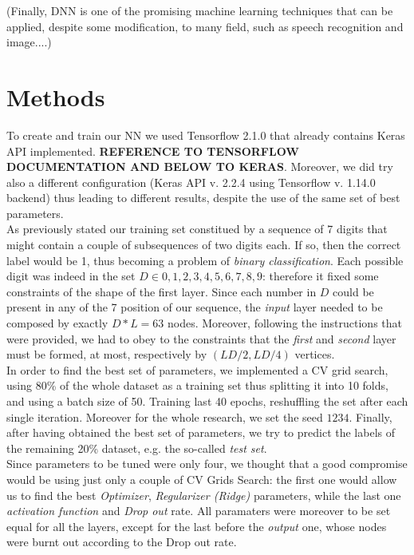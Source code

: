 \documentclass[prl,twocolumn]{revtex4-1}
\begin{document}
(Finally, DNN is one of the promising machine learning techniques that can be applied, despite some modification, to many field, such as speech recognition and image....)





\section{Methods}
To create and train our NN we used Tensorflow 2.1.0 that already contains Keras API implemented. \textbf{REFERENCE TO TENSORFLOW DOCUMENTATION AND BELOW TO KERAS}. Moreover, we did try also a different configuration (Keras API v. 2.2.4 using Tensorflow v. 1.14.0 backend) thus leading to different results, despite the use of the same set of best parameters.\\
As previously stated our training set constitued by a sequence of 7 digits that might contain a couple of subsequences of two digits each. If so, then the correct label would be 1, thus becoming a problem of \textit{binary classification}. Each possible digit was indeed in the set $D \in  {0,1,2,3,4,5,6,7,8,9}$: therefore it fixed some constraints of the shape of the first layer. Since each number in $D$ could be present in any of the 7 position of our sequence, the \textit{input} layer needed to be composed by exactly $D*L=63$ nodes. Moreover, following the instructions that were provided, we had to obey to the constraints that the \textit{first} and \textit{second} layer must be formed, at most,  respectively by $(LD/2, LD/4)$ vertices.\\
In order to find the best set of parameters, we implemented a CV grid search, using 80\% of the whole dataset as a training set thus splitting it into 10 folds, and using a batch size of 50. Training last 40 epochs, reshuffling the set after each single iteration. Moreover for the whole research, we set the seed $1234$. Finally, after having obtained the best set of parameters, we try to predict the labels of the remaining 20\% dataset, e.g. the so-called \textit{test set}.\\
Since parameters to be tuned were only four, we thought that a good compromise would be using just only a couple of CV Grids Search: the first one would allow us to find the best \textit{Optimizer}, \textit{Regularizer (Ridge)} parameters, while the last one \textit{activation function} and \textit{Drop out} rate. All paramaters were moreover to be set equal for all the layers, except for the last before the \textit{output} one, whose nodes were burnt out according to the Drop out rate.\\
\end{document}
